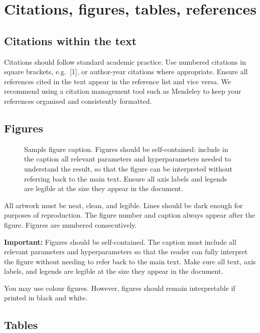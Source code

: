\documentclass{article}
\begin{document}
\section{Citations, figures, tables, references}
\label{others}


\subsection{Citations within the text}


Citations should follow standard academic practice. Use numbered citations
in square brackets, e.g.\ [1], or author-year citations where appropriate.
Ensure all references cited in the text appear in the reference list and
vice versa. We recommend using a citation management tool such as Mendeley
to keep your references organised and consistently formatted.


\subsection{Figures}


\begin{figure}
  \centering
  \fbox{\rule[-.5cm]{0cm}{4cm} \rule[-.5cm]{4cm}{0cm}}
  \caption{Sample figure caption. Figures should be self-contained: include
  in the caption all relevant parameters and hyperparameters needed to
  understand the result, so that the figure can be interpreted without
  referring back to the main text. Ensure all axis labels and legends are
  legible at the size they appear in the document.}
\end{figure}


All artwork must be neat, clean, and legible. Lines should be dark enough for
purposes of reproduction. The figure number and caption always appear after the
figure. Figures are numbered consecutively.

\textbf{Important:} Figures should be self-contained. The caption must include
all relevant parameters and hyperparameters so that the reader can fully
interpret the figure without needing to refer back to the main text. Make sure
all text, axis labels, and legends are legible at the size they appear in the
document.

You may use colour figures. However, figures should remain interpretable if
printed in black and white.


\subsection{Tables}
\end{document}
